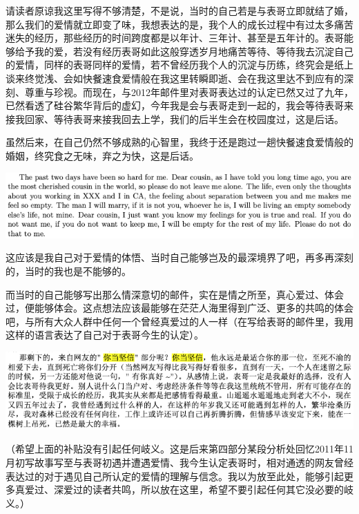 \documentclass[9pt, b5paper]{article}
\begin{document}
请读者原谅我这里写得不够清楚，不是说，当时的自己若是与表哥立即就结了婚，那么我们的爱情就立即变了味，我想表达的是，我个人的成长过程中有过太多痛苦迷失的经历，那些经历的时间跨度都是以年计、三年计、甚至是五年计的。表哥能够给予我的爱，若没有经历表哥如此这般穿透岁月地痛苦等待、等待我去沉淀自己的爱情，同样的表哥同样的爱情，若不曾经历我个人的沉淀与历练，终究会是纸上谈来终觉浅、会如快餐速食爱情般在我这里转瞬即逝、会在我这里达不到应有的深刻、尊重与珍视。而现在，与2012年邮件里对表哥表达过的认定已然又过了九年，已然看透了硅谷繁华背后的虚幻，今年我是会与表哥走到一起的，我会等待表哥来接我回家、等待表哥来接我回去上学，我们的后半生会在校园度过，这是后话。 

虽然后来，在自己仍然不够成熟的心智里，我终于还是跑过一趟快餐速食爱情般的婚姻，终究食之无味，弃之为快，这是后话。

\begin{center}
\includegraphics[width=.9\linewidth]{./pic/p1p116-4.png}
\end{center}

这应该是我自己对于爱情的体悟、当时自己能够岂及的最深境界了吧，再多再深刻的，当时的我也是不能够的。

而当时的自己能够写出那么情深意切的邮件，实在是情之所至，真心爱过、体会过，便能够体会。这点想法应该最能够在茫茫人海里得到广泛、更多的共鸣的体会吧，与所有大众人群中任何一个曾经真爱过的人一样（在写给表哥的邮件里，我用这样的语言表达了自己对于表哥今生的认定）。

\begin{center}
\includegraphics[width=.9\linewidth]{./pic/p4p15.png}
\end{center}

（希望上面的补贴没有引起任何岐义。这是后来第四部分某段分析处回忆2011年11月初写故事写至与表哥初遇并遭遇爱情、我今生认定表哥时，相对通透的网友曾经表达过的对于遇见自己所认定的爱情的理解与信念。我以为放至此处，能够引起更多真爱过、深爱过的读者共鸣，所以放在这里，希望不要引起任何其它没必要的岐义。）
\end{document}
